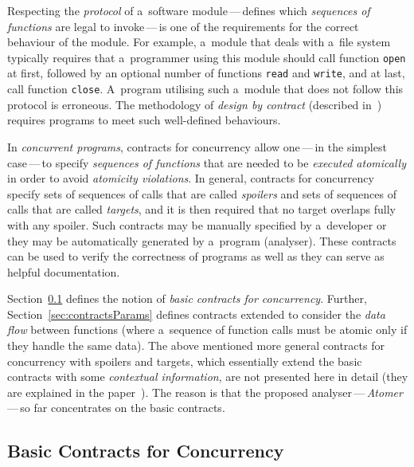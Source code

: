 Respecting the \emph{protocol} of a~software module\,---\,defines
which \emph{sequences of functions} are legal to invoke\,---\,is one of the
requirements for the correct behaviour of the module. For example, a~module
that deals with a~file system typically requires that a~programmer using
this module should call function \texttt{open} at first, followed by an
optional number of functions \texttt{read} and \texttt{write}, and at last,
call function \texttt{close}. A~program utilising such a~module that does
not follow this protocol is erroneous. The methodology of \emph{design by
contract} (described in~\cite{contract}) requires programs to meet
such well-defined behaviours.~\cite{contracts2015}

In \emph{concurrent programs}, contracts for concurrency allow
one\,---\,in the simplest case\,---\,to specify \emph{sequences of
functions} that are needed to be \emph{executed atomically} in order to
avoid \emph{atomicity violations}. In general, contracts for concurrency
specify sets of sequences of calls that are called \emph{spoilers} and sets
of sequences of calls that are called \emph{targets}, and it is then
required that no target overlaps fully with any spoiler. Such contracts may
be manually specified by a~developer or they may be automatically generated
by a~program (analyser). These contracts can be used to verify the
correctness of programs as well as they can serve as helpful documentation.

Section~\ref{sec:contractsBasic} defines the notion of \emph{basic contracts
for concurrency}. Further, Section~\ref{sec:contractsParams} defines
contracts extended to consider the \emph{data flow} between functions
(where a~sequence of function calls must be atomic only if they handle the
same data). The above mentioned more general contracts for concurrency with
spoilers and targets, which essentially extend the basic contracts with
some \emph{contextual information}, are not presented here in detail
(they are explained in the paper~\cite{contracts2017}). The reason is that
the proposed analyser\,---\,\emph{Atomer}\,---\,so far concentrates on the
basic contracts.

\subsection{Basic Contracts for Concurrency}
\label{sec:contractsBasic}

